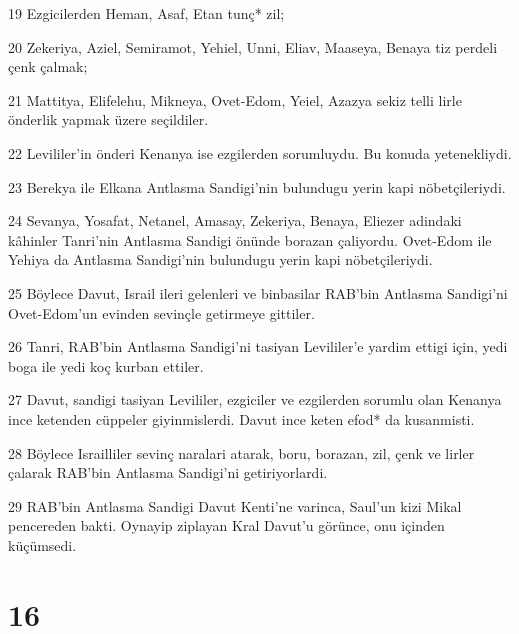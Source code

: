 \par 19 Ezgicilerden Heman, Asaf, Etan tunç* zil;
\par 20 Zekeriya, Aziel, Semiramot, Yehiel, Unni, Eliav, Maaseya, Benaya tiz perdeli çenk çalmak;
\par 21 Mattitya, Elifelehu, Mikneya, Ovet-Edom, Yeiel, Azazya sekiz telli lirle önderlik yapmak üzere seçildiler.
\par 22 Levililer'in önderi Kenanya ise ezgilerden sorumluydu. Bu konuda yetenekliydi.
\par 23 Berekya ile Elkana Antlasma Sandigi'nin bulundugu yerin kapi nöbetçileriydi.
\par 24 Sevanya, Yosafat, Netanel, Amasay, Zekeriya, Benaya, Eliezer adindaki kâhinler Tanri'nin Antlasma Sandigi önünde borazan çaliyordu. Ovet-Edom ile Yehiya da Antlasma Sandigi'nin bulundugu yerin kapi nöbetçileriydi.
\par 25 Böylece Davut, Israil ileri gelenleri ve binbasilar RAB'bin Antlasma Sandigi'ni Ovet-Edom'un evinden sevinçle getirmeye gittiler.
\par 26 Tanri, RAB'bin Antlasma Sandigi'ni tasiyan Levililer'e yardim ettigi için, yedi boga ile yedi koç kurban ettiler.
\par 27 Davut, sandigi tasiyan Levililer, ezgiciler ve ezgilerden sorumlu olan Kenanya ince ketenden cüppeler giyinmislerdi. Davut ince keten efod* da kusanmisti.
\par 28 Böylece Israilliler sevinç naralari atarak, boru, borazan, zil, çenk ve lirler çalarak RAB'bin Antlasma Sandigi'ni getiriyorlardi.
\par 29 RAB'bin Antlasma Sandigi Davut Kenti'ne varinca, Saul'un kizi Mikal pencereden bakti. Oynayip ziplayan Kral Davut'u görünce, onu içinden küçümsedi.

\chapter{16}

